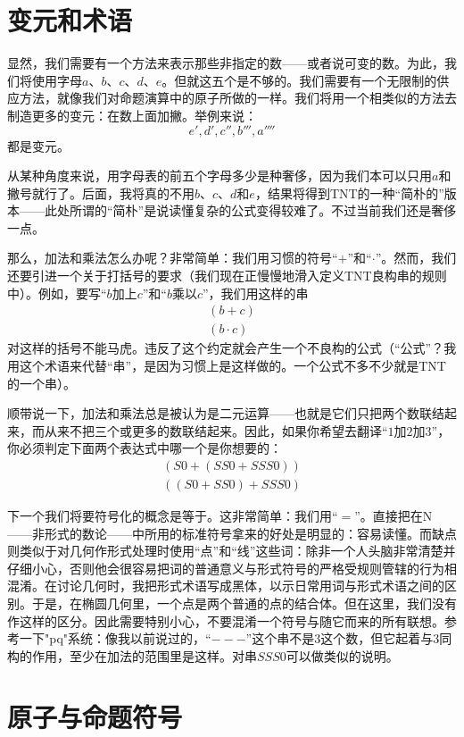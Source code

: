 \section{变元和术语}

显然，我们需要有一个方法来表示那些非指定的数——或者说可变的数。为此，我们将使用字母$a$、$b$、$c$、$d$、$e$。但就这五个是不够的。我们需要有一个无限制的供应方法，就像我们对命题演算中的原子所做的一样。我们将用一个相类似的方法去制造更多的变元：在数上面加撇。举例来说：
\[
e', d', c'', b''', a''''
\]
都是变元。

从某种角度来说，用字母表的前五个字母多少是种奢侈，因为我们本可以只用$a$和撇号就行了。后面，我将真的不用$b$、$c$、$d$和$e$，结果将得到TNT的一种“简朴的”版本——此处所谓的“简朴”是说读懂复杂的公式变得较难了。不过当前我们还是奢侈一点。

那么，加法和乘法怎么办呢？非常简单：我们用习惯的符号“$+$”和“$\cdot$”。然而，我们还要引进一个关于打括号的要求（我们现在正慢慢地滑入定义TNT良构串的规则中）。例如，要写“$b$加上$c$”和“$b$乘以$c$”，我们用这样的串
\begin{gather*}
(b+c)\\
(b\cdot c)
\end{gather*}
对这样的括号不能马虎。违反了这个约定就会产生一个不良构的公式（“公式”？我用这个术语来代替“串”，是因为习惯上是这样做的。一个公式不多不少就是TNT的一个串）。

顺带说一下，加法和乘法总是被认为是二元运算——也就是它们只把两个数联结起来，而从来不把三个或更多的数联结起来。因此，如果你希望去翻译“$1$加$2$加$3$”，你必须判定下面两个表达式中哪一个是你想要的：
\begin{gather*}
(S0+(SS0+SSS0))\\
((S0+SS0)+SSS0)
\end{gather*}

下一个我们将要符号化的概念是等于。这非常简单：我们用“$=$”。直接把在N——非形式的数论——中所用的标准符号拿来的好处是明显的：容易读懂。而缺点则类似于对几何作形式处理时使用“点”和“线”这些词：除非一个人头脑非常清楚并仔细小心，否则他会很容易把词的普通意义与形式符号的严格受规则管辖的行为相混淆。在讨论几何时，我把形式术语写成黑体，以示日常用词与形式术语之间的区别。于是，在椭圆几何里，一个点是两个普通的点的结合体。但在这里，我们没有作这样的区分。因此需要特别小心，不要混淆一个符号与随它而来的所有联想。参考一下"pq"系统：像我以前说过的，“${-}{-}{-}$”这个串不是$3$这个数，但它起着与$3$同构的作用，至少在加法的范围里是这样。对串$SSS0$可以做类似的说明。

\section{原子与命题符号}

